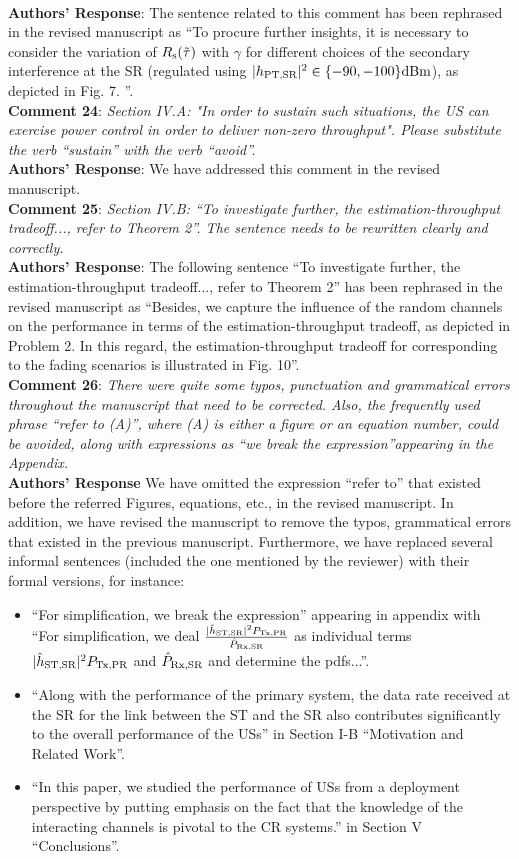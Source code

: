 \documentclass[12pt,a4wide,peerreview]{IEEEtran}
\newcommand{\tc}[1]{#1}
\begin{document}
\\
\textbf{Authors' Response}:
The sentence related to this comment has been rephrased in the revised manuscript as ``To procure further insights, it is necessary to consider the variation of $R_{\text{s}}(\tilde{\tau})$ with $\gamma$ for different choices of the secondary interference at the SR (regulated using $|h_{\text{PT,SR}}|^2 \in \{-90, -100\} \SI{}{dBm}$), as depicted in Fig. 7. ''.
\\
\textbf{\tc{Comment 24}}: 
\textit{
Section IV.A: "In order to sustain such situations, the US can exercise power control in order to deliver non-zero throughput". Please substitute the verb ``sustain'' with the verb ``avoid''.
}
\\
\textbf{Authors' Response}:
We have addressed this comment in the revised manuscript.
\\
\textbf{\tc{Comment 25}}: 
\textit{
Section IV.B: ``To investigate further, the estimation-throughput tradeoff..., refer to Theorem 2''. The sentence needs to be rewritten clearly and correctly.
}
\\
\textbf{Authors' Response}:
The following sentence ``To investigate further, the estimation-throughput tradeoff..., refer to Theorem 2'' has been rephrased in the revised manuscript as ``Besides, we capture the influence of the random channels on the performance in terms of the estimation-throughput tradeoff, as depicted in Problem 2. In this regard, the estimation-throughput tradeoff for corresponding to the fading scenarios is illustrated in Fig. 10''.
\\
\textbf{\tc{Comment 26}}: 
\textit{
There were quite some typos, punctuation and grammatical errors throughout the manuscript that need to be corrected. Also, the frequently used phrase ``refer to (A)'', where (A) is either a figure or an equation number, could be avoided, along with expressions as ``we break the expression''appearing in the Appendix.
}
\\
\textbf{Authors' Response}
We have omitted the expression ``refer to'' that existed before the referred Figures, equations, etc.,  in the revised manuscript. In addition, we have revised the manuscript to remove the typos, grammatical errors that existed in the previous manuscript. Furthermore, we have replaced several informal sentences (included the one mentioned by the reviewer) with their formal versions, for instance:
\begin{itemize}
\item ``For simplification, we break the expression'' appearing in appendix with ``For simplification, we deal $\frac{|\hat{h}_{\text{ST,SR}}|^2 P_{\text{Tx,PR}}}{\hat{P}_{\text{Rx,SR}}}$ as individual terms $|\hat{h}_{\text{ST,SR}}|^2 P_{\text{Tx,PR}}$ and $\hat{P}_{\text{Rx,SR}}$ and determine the pdfs...''.
\item ``Along with the performance of the primary system, the data rate received at the SR for the link between the ST and the SR also contributes significantly to the overall performance of the USs'' in Section I-B ``Motivation and Related Work''.
\item ``In this paper, we studied the performance of USs from a deployment perspective by putting emphasis on the fact that the knowledge of the interacting channels is pivotal to the CR systems.'' in Section V ``Conclusions''.
\end{itemize} 
\end{document}
